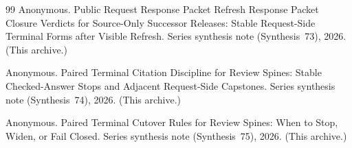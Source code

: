 \documentclass[11pt]{article}
\begin{document}
\begin{thebibliography}{99}
Anonymous.
\newblock Public Request Response Packet Refresh Response Packet Closure Verdicts for Source-Only Successor Releases: Stable Request-Side Terminal Forms after Visible Refresh.
\newblock Series synthesis note (Synthesis~73), 2026. (This archive.)

Anonymous.
\newblock Paired Terminal Citation Discipline for Review Spines: Stable Checked-Answer Stops and Adjacent Request-Side Capstones.
\newblock Series synthesis note (Synthesis~74), 2026. (This archive.)

Anonymous.
\newblock Paired Terminal Cutover Rules for Review Spines: When to Stop, Widen, or Fail Closed.
\newblock Series synthesis note (Synthesis~75), 2026. (This archive.)

\end{thebibliography}
\end{document}
